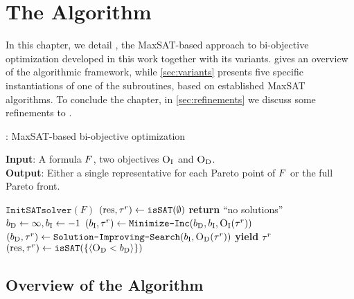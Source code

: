\chapter{The \algname{} Algorithm\label{chap:approach}}

In this chapter, we detail \algname{}, the MaxSAT-based approach to bi-objective optimization developed in this work together with its variants.
 gives an overview of the algorithmic framework, while \cref{sec:variants} presents five specific instantiations of one of the subroutines, based on established MaxSAT algorithms.
To conclude the chapter, in \cref{sec:refinements} we discuss some refinements to \algname{}.

\begin{algorithm}[t]
  \caption{\algname{}: MaxSAT-based  bi-objective optimization} %
  \label{alg:base-algorithm}
  \textbf{Input}: A formula $F$, two objectives $\textsc{O}_{\text{I}}$ and $\textsc{O}_{\text{D}}$.\\
  \textbf{Output}: Either a single representative for each Pareto point of $F$ or the full Pareto front.

  \begin{algorithmic}[1]
    \STATE $\texttt{InitSATsolver}(F)$ \label{l:init-solv} 
    \STATE $(\text{res}, \tau^r) \gets \texttt{isSAT}(\emptyset)$ \quad{}  \label{l:sols} 
    \IF{$\res=\unsat$}
      \STATE \textbf{return} ``no solutions''
    \ENDIF
    \STATE $b_{\text{D}} \gets \infty, b_{\text{I}} \gets -1$ \label{l:bounds}
    \WHILE{$\res = \sat$} \label{l:loopstart}
      \STATE $(b_{\text{I}}, \tau^r) \gets \texttt{Minimize-\allowbreak{}Inc}(b_{\text{D}} , b_{\text{I}}, \textsc{O}_{\text{I}}(\tau^r))$  \quad{}\label{l:minim1}
      \STATE $(b_{\text{D}}, \tau^r) \gets  \texttt{Solution-\allowbreak{}Improving-\allowbreak{}Search}(b_{\text{I}} , \textsc{O}_{\text{D}}(\tau^r))$  \quad{}\label{l:minim2}
      \STATE \textbf{yield} $\tau^r$  \quad{} \label{ln:stage3} 
      \STATE $(\text{res}, \tau^r) \gets \texttt{isSAT}(\{\langle \textsc{O}_{\text{D}} < b_{\text{D}} \rangle\})$\label{l:endL}
    \ENDWHILE
  \end{algorithmic}
\end{algorithm}


\section{Overview of the Algorithm\label{sec:algorithm}}

